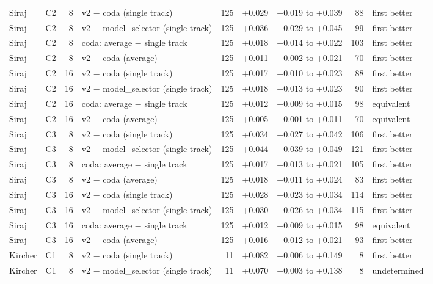 {\begin{longtable}{llrlrrlrl}
Siraj & C2 & 8 & v2 $-$ coda (single track) & 125 & +0.029 & +0.019 to +0.039 & 88 & first better \\
Siraj & C2 & 8 & v2 $-$ model\_selector (single track) & 125 & +0.036 & +0.029 to +0.045 & 99 & first better \\
Siraj & C2 & 8 & coda: average $-$ single track & 125 & +0.018 & +0.014 to +0.022 & 103 & first better \\
Siraj & C2 & 8 & v2 $-$ coda (average) & 125 & +0.011 & +0.002 to +0.021 & 70 & first better \\
Siraj & C2 & 16 & v2 $-$ coda (single track) & 125 & +0.017 & +0.010 to +0.023 & 88 & first better \\
Siraj & C2 & 16 & v2 $-$ model\_selector (single track) & 125 & +0.018 & +0.013 to +0.023 & 90 & first better \\
Siraj & C2 & 16 & coda: average $-$ single track & 125 & +0.012 & +0.009 to +0.015 & 98 & equivalent  \\
Siraj & C2 & 16 & v2 $-$ coda (average) & 125 & +0.005 & $-$0.001 to +0.011 & 70 & equivalent  \\
Siraj & C3 & 8 & v2 $-$ coda (single track) & 125 & +0.034 & +0.027 to +0.042 & 106 & first better \\
Siraj & C3 & 8 & v2 $-$ model\_selector (single track) & 125 & +0.044 & +0.039 to +0.049 & 121 & first better \\
Siraj & C3 & 8 & coda: average $-$ single track & 125 & +0.017 & +0.013 to +0.021 & 105 & first better \\
Siraj & C3 & 8 & v2 $-$ coda (average) & 125 & +0.018 & +0.011 to +0.024 & 83 & first better \\
Siraj & C3 & 16 & v2 $-$ coda (single track) & 125 & +0.028 & +0.023 to +0.034 & 114 & first better \\
Siraj & C3 & 16 & v2 $-$ model\_selector (single track) & 125 & +0.030 & +0.026 to +0.034 & 115 & first better \\
Siraj & C3 & 16 & coda: average $-$ single track & 125 & +0.012 & +0.009 to +0.015 & 98 & equivalent  \\
Siraj & C3 & 16 & v2 $-$ coda (average) & 125 & +0.016 & +0.012 to +0.021 & 93 & first better \\
Kircher & C1 & 8 & v2 $-$ coda (single track) & 11 & +0.082 & +0.006 to +0.149 & 8 & first better \\
Kircher & C1 & 8 & v2 $-$ model\_selector (single track) & 11 & +0.070 & $-$0.003 to +0.138 & 8 & undetermined \\

\end{longtable}}
